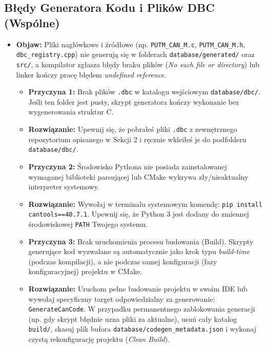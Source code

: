 \documentclass[a4paper,11pt]{article}
\begin{document}
\begin{commonbox}
\subsection*{Błędy Generatora Kodu i Plików DBC (Wspólne)}
\begin{itemize}
    \item \textbf{Objaw:} Pliki nagłówkowe i źródłowe (np. \texttt{PUTM\_CAN\_M.c}, \texttt{PUTM\_CAN\_M.h}, \texttt{dbc\_registry.cpp}) nie generują się w folderach \texttt{database/generated/} oraz \texttt{src/}, a kompilator zgłasza błędy braku plików (\textit{No such file or directory}) lub linker kończy pracę błędem \textit{undefined reference}.
    \begin{itemize}
        \item \textbf{Przyczyna 1:} Brak plików \texttt{.dbc} w katalogu wejściowym \texttt{database/dbc/}. Jeśli ten folder jest pusty, skrypt generatora kończy wykonanie bez wygenerowania struktur C.
        \item \textbf{Rozwiązanie:} Upewnij się, że pobrałeś pliki \texttt{.dbc} z zewnętrznego repozytorium opisanego w Sekcji 2 i ręcznie wkleiłeś je do podfolderu \texttt{database/dbc/}.
        \item \textbf{Przyczyna 2:} Środowisko Pythona nie posiada zainstalowanej wymaganej biblioteki parsującej lub CMake wykrywa zły/nieaktualny interpreter systemowy.
        \item \textbf{Rozwiązanie:} Wywołaj w terminalu systemowym komendę: \texttt{pip install cantools==40.7.1}. Upewnij się, że Python 3 jest dodany do zmiennej środowiskowej \texttt{PATH} Twojego systemu.
        \item \textbf{Przyczyna 3:} Brak uruchomienia procesu budowania (Build). Skrypty generujące kod wyzwalane są automatycznie jako krok typu \textit{build-time} (podczas kompilacji), a nie podczas samej konfiguracji (fazy konfiguracyjnej) projektu w CMake.
        \item \textbf{Rozwiązanie:} Uruchom pełne budowanie projektu w swoim IDE lub wywołaj specyficzny target odpowiedzialny za generowanie: \texttt{GenerateCanCode}. W przypadku permanentnego zablokowania generacji (np. gdy skrypt błędnie uzna pliki za aktualne), usuń cały katalog \texttt{build/}, skasuj plik bufora \texttt{database/codegen\_metadata.json} i wykonaj czystą rekonfigurację projektu (\textit{Clean Build}).
    \end{itemize}
\end{itemize}
\end{commonbox}
\vspace{1em}
\end{document}
